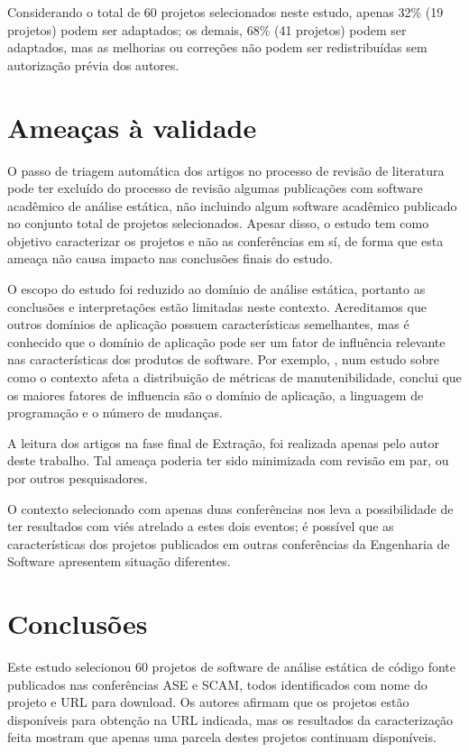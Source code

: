 Considerando o total de 60 projetos selecionados neste estudo, apenas 32\% (19
projetos) podem ser adaptados; os demais, 68\% (41 projetos) podem ser
adaptados, mas as melhorias ou correções não podem ser redistribuídas sem
autorização prévia dos autores.


\section{Ameaças à validade} %

O passo de triagem automática dos artigos no processo de revisão de literatura
pode ter excluído do processo de revisão algumas publicações com software
acadêmico de análise estática, não incluindo algum software acadêmico publicado no conjunto total de projetos
selecionados. Apesar disso, o estudo tem como objetivo
caracterizar os projetos e não as conferências em sí, de forma que esta ameaça
não causa impacto nas conclusões finais do estudo.

O escopo do estudo foi reduzido ao domínio de análise estática, portanto as
conclusões e interpretações estão limitadas neste contexto. Acreditamos que
outros domínios de aplicação possuem características semelhantes, mas é
conhecido que o domínio de aplicação pode ser um fator de influência relevante nas
características dos produtos de software.
Por exemplo, , num estudo sobre como o contexto afeta
a distribuição de métricas de manutenibilidade, conclui que os maiores fatores
de influencia são o domínio de aplicação, a linguagem de programação e o número
de mudanças.

A leitura dos artigos na fase final de Extração, foi realizada
apenas pelo autor deste trabalho. Tal ameaça poderia ter sido minimizada com
revisão em par, ou por outros pesquisadores.

O contexto selecionado com apenas duas conferências nos leva a possibilidade de
ter resultados com viés atrelado a estes dois eventos; é possível que as
características dos projetos publicados em outras conferências da Engenharia de
Software apresentem situação diferentes.


\section{Conclusões} \label{estudo1:conclusoes} %

Este estudo selecionou 60 projetos de software de análise estática de código
fonte publicados nas conferências ASE e SCAM, todos identificados com nome do
projeto e URL para download. Os autores afirmam que os projetos estão
disponíveis para obtenção na URL indicada, mas os resultados da caracterização
feita mostram que apenas uma parcela destes projetos continuam disponíveis.

